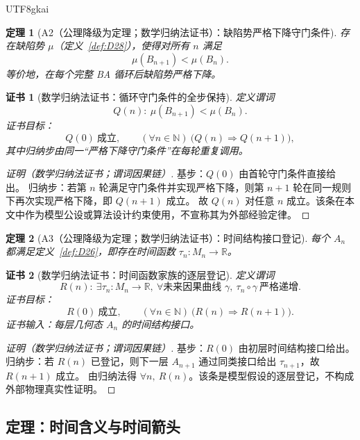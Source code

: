 \documentclass[12pt]{article}
\newtheorem{theorem}{定理}[section]
\newtheorem{Certificate}{证书}[section]
\begin{document}
\begin{CJK*}{UTF8}{gkai}
\begin{theorem}[A2（公理降级为定理；数学归纳法证书）：缺陷势严格下降守门条件]
\label{thm:A2-ba}
存在缺陷势 $\mu$（定义~\ref{def:D28}），使得对所有 $n$ 满足
\[
\mu(B_{n+1})<\mu(B_n).
\]
等价地，在每个完整 BA 循环后缺陷势严格下降。
\end{theorem}

\begin{Certificate}[数学归纳法证书：循环守门条件的全步保持]
\label{cert:A2-ba}
定义谓词
\[
Q(n):\ \mu(B_{n+1})<\mu(B_n).
\]
证书目标：
\[
Q(0)\ \text{成立},\qquad (\forall n\in\mathbb N)\ \bigl(Q(n)\Rightarrow Q(n+1)\bigr),
\]
其中归纳步由同一“严格下降守门条件”在每轮重复调用。
\end{Certificate}

\begin{proof}[证明（数学归纳法证书；谓词因果链）]
基步：$Q(0)$ 由首轮守门条件直接给出。
归纳步：若第 $n$ 轮满足守门条件并实现严格下降，则第 $n+1$ 轮在同一规则下再次实现严格下降，即 $Q(n+1)$ 成立。
故 $Q(n)$ 对任意 $n$ 成立。该条在本文中作为模型公设或算法设计约束使用，不宣称其为外部经验定律。
\end{proof}

\begin{theorem}[A3（公理降级为定理；数学归纳法证书）：时间结构接口登记]
\label{thm:A3-ba}
每个 $A_n$ 都满足定义~\ref{def:D26}，即存在时间函数 $\tau_n:M_n\to\mathbb R$。
\end{theorem}

\begin{Certificate}[数学归纳法证书：时间函数家族的逐层登记]
\label{cert:A3-ba}
定义谓词
\[
R(n):\ \exists \tau_n:M_n\to\mathbb R,\ \forall\text{未来因果曲线 }\gamma,\ \tau_n\circ\gamma\ \text{严格递增}.
\]
证书目标：
\[
R(0)\ \text{成立},\qquad (\forall n\in\mathbb N)\ \bigl(R(n)\Rightarrow R(n+1)\bigr).
\]
证书输入：每层几何态 $A_n$ 的时间结构接口。
\end{Certificate}

\begin{proof}[证明（数学归纳法证书；谓词因果链）]
基步：$R(0)$ 由初层时间结构接口给出。
归纳步：若 $R(n)$ 已登记，则下一层 $A_{n+1}$ 通过同类接口给出 $\tau_{n+1}$，故 $R(n+1)$ 成立。
由归纳法得 $\forall n,\ R(n)$。该条是模型假设的逐层登记，不构成外部物理真实性证明。
\end{proof}

\subsection{定理：时间含义与时间箭头}


\end{CJK*}
\end{document}
